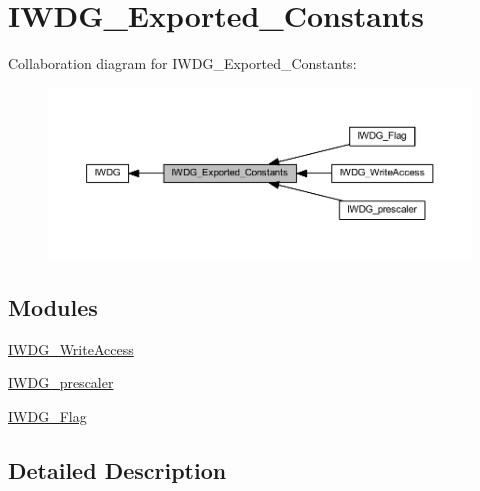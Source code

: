 \hypertarget{group___i_w_d_g___exported___constants}{}\section{I\+W\+D\+G\+\_\+\+Exported\+\_\+\+Constants}
\label{group___i_w_d_g___exported___constants}
Collaboration diagram for I\+W\+D\+G\+\_\+\+Exported\+\_\+\+Constants\+:
\nopagebreak
\begin{figure}[H]
\begin{center}
\leavevmode
\includegraphics[width=350pt]{group___i_w_d_g___exported___constants}
\end{center}
\end{figure}
\subsection*{Modules}
\begin{DoxyCompactItemize}
\item 
\hyperlink{group___i_w_d_g___write_access}{I\+W\+D\+G\+\_\+\+Write\+Access}
\item 
\hyperlink{group___i_w_d_g__prescaler}{I\+W\+D\+G\+\_\+prescaler}
\item 
\hyperlink{group___i_w_d_g___flag}{I\+W\+D\+G\+\_\+\+Flag}
\end{DoxyCompactItemize}


\subsection{Detailed Description}
